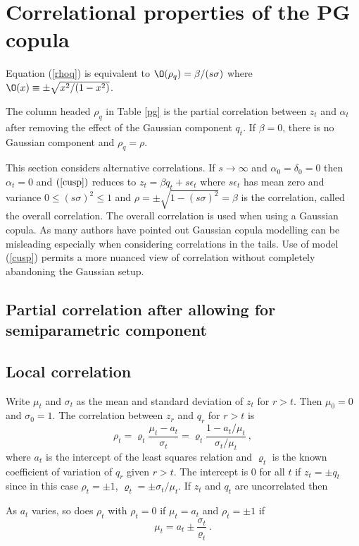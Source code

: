 \documentclass[authoryear]{elsarticle}
\newcommand{\eps}{\epsilon}
\newcommand{\eref}[1]{(\ref{#1})}
\newcommand{\tref}[1]{Table \ref{#1}}
\begin{document}
 \section{Correlational properties of the PG copula}
 
 Equation \eref{rhoq} is equivalent to  
$
\O(\rho_q) =\beta/(s\sigma)
$
where $\O(x) \equiv \pm\sqrt{x^2/(1-x^2)}$.
 
 The column headed $\rho_q$ in \tref{pg} is the partial correlation between $z_t$ and $\alpha_t$ after removing the effect of the Gaussian component $q_t$.  If $\beta=0$, there is no Gaussian component and $\rho_q=\rho$.
 
 This section considers alternative correlations.   If $s\rightarrow\infty$ and $\alpha_0=\delta_0=0$ then $\alpha_t=0$ and $\eref{cusp}$ reduces to $z_t=\beta q_t+s\eps_t$ where $s\eps_t$ has mean zero and variance $0\le (s\sigma)^2\le 1$ and $\rho=\pm\sqrt{1-(s\sigma)^2}=\beta$ is the correlation, called the overall correlation.  The overall correlation is used when using a Gaussian copula.
As many authors have pointed out Gaussian copula modelling can be misleading especially when considering correlations in the tails.
Use of model \eref{cusp} permits a more nuanced view of correlation without completely abandoning the Gaussian setup.

\subsection{Partial correlation after allowing for semiparametric component}
 

\subsection{Local correlation}

Write  $\mu_t$ and  $\sigma_t$ as the mean and standard deviation of $z_t$ for $r>t$.   Then $\mu_0=0$ and $\sigma_0=1$.   The correlation between $z_r$ and $q_r$ for $r>t$ is
$$
\rho_t= \varrho_t \frac{\mu_t-a_t}{\sigma_t}= \varrho_t \frac{1-a_t/\mu_t}{\sigma_t/\mu_t}\ ,
$$
where $a_t$ is the intercept of the least squares relation and  $\varrho_t$ is the  known coefficient of variation of $q_r$ given $r>t$.   The intercept is 0 for all $t$ if $z_t=\pm q_t$ since in this case  $\rho_t=\pm 1$, $\varrho_t=\pm \sigma_t/\mu_t$.  If $z_t$ and $q_t$ are uncorrelated then 



  As $a_t$ varies, so does $\rho_t$ with $\rho_t=0$ if $\mu_t=a_t$ and $\rho_t=\pm 1$ if  
$$
\mu_t= a_t \pm \frac{\sigma_t}{\varrho_t} \ .
$$
\end{document}
